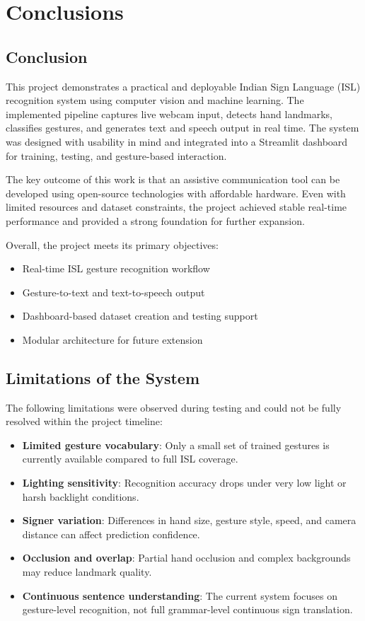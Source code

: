 \chapter{Conclusions}

\section{Conclusion}

This project demonstrates a practical and deployable Indian Sign Language (ISL) recognition system using computer vision and machine learning. The implemented pipeline captures live webcam input, detects hand landmarks, classifies gestures, and generates text and speech output in real time. The system was designed with usability in mind and integrated into a Streamlit dashboard for training, testing, and gesture-based interaction.

The key outcome of this work is that an assistive communication tool can be developed using open-source technologies with affordable hardware. Even with limited resources and dataset constraints, the project achieved stable real-time performance and provided a strong foundation for further expansion.

Overall, the project meets its primary objectives:
\begin{itemize}
    \item Real-time ISL gesture recognition workflow
    \item Gesture-to-text and text-to-speech output
    \item Dashboard-based dataset creation and testing support
    \item Modular architecture for future extension
\end{itemize}

\section{Limitations of the System}

The following limitations were observed during testing and could not be fully resolved within the project timeline:
\begin{itemize}
    \item \textbf{Limited gesture vocabulary}: Only a small set of trained gestures is currently available compared to full ISL coverage.
    \item \textbf{Lighting sensitivity}: Recognition accuracy drops under very low light or harsh backlight conditions.
    \item \textbf{Signer variation}: Differences in hand size, gesture style, speed, and camera distance can affect prediction confidence.
    \item \textbf{Occlusion and overlap}: Partial hand occlusion and complex backgrounds may reduce landmark quality.
    \item \textbf{Continuous sentence understanding}: The current system focuses on gesture-level recognition, not full grammar-level continuous sign translation.
\end{itemize}

